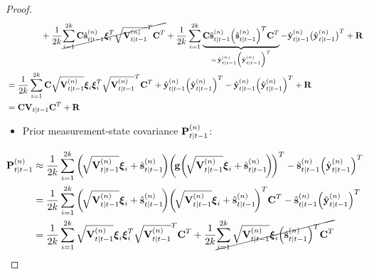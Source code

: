 \begin{proof}
\begin{align*}
						&\qquad\qquad + \frac{1}{2k} \cancel{\sum_{i = 1}^{2k} \boldsymbol{\mathrm{C}} \hat{\boldsymbol{\mathrm{s}}}_{t \vert t - 1}^{(n)} \boldsymbol{\mathrm{\xi}}_i^T \sqrt{\boldsymbol{\mathrm{V}}_{t \vert t - 1}^{(n)}}^T \boldsymbol{\mathrm{C}}^T} + \frac{1}{2k} \sum_{i = 1}^{2k} \underbrace{\boldsymbol{\mathrm{C}} \hat{\boldsymbol{\mathrm{s}}}_{t \vert t - 1}^{(n)} \Big(\hat{\boldsymbol{\mathrm{s}}}_{t \vert t - 1}^{(n)}\Big)^T \boldsymbol{\mathrm{C}}^T}_{=\, \hat{\boldsymbol{\mathrm{y}}}_{t \vert t - 1}^{(n)} \Big( \hat{\boldsymbol{\mathrm{y}}}_{t \vert t - 1}^{(n)} \Big)^T} - \hat{\boldsymbol{\mathrm{y}}}_{t \vert t - 1}^{(n)} \big( \hat{\boldsymbol{\mathrm{y}}}_{t \vert t - 1}^{(n)} \big)^T + \boldsymbol{\mathrm{R}} \\
					&= \frac{1}{2k} \sum_{i = 1}^{2k} \boldsymbol{\mathrm{C}} \sqrt{\boldsymbol{\mathrm{V}}_{t \vert t - 1}^{(n)}} \boldsymbol{\mathrm{\xi}}_i \boldsymbol{\mathrm{\xi}}_i^T \sqrt{\boldsymbol{\mathrm{V}}_{t \vert t - 1}^{(n)}}^T \boldsymbol{\mathrm{C}}^T + \hat{\boldsymbol{\mathrm{y}}}_{t \vert t - 1}^{(n)} \Big( \hat{\boldsymbol{\mathrm{y}}}_{t \vert t - 1}^{(n)} \Big)^T - \hat{\boldsymbol{\mathrm{y}}}_{t \vert t - 1}^{(n)} \Big( \hat{\boldsymbol{\mathrm{y}}}_{t \vert t - 1}^{(n)} \Big)^T + \boldsymbol{\mathrm{R}} \\
					&= \boldsymbol{\mathrm{C}} \boldsymbol{\mathrm{V}}_{t \vert t - 1} \boldsymbol{\mathrm{C}}^T + \boldsymbol{\mathrm{R}}
			\end{align*}
			\begin{itemize}
				\item Prior measurement-state covariance \( \boldsymbol{\mathrm{P}}_{t \vert t - 1}^{(n)} \):
			\end{itemize}
			\begin{align*}
				\mat{P}_{t \subgiven t - 1}^{(n)}
					&\approx \frac{1}{2k} \sum_{i = 1}^{2k} \bigg(\!\sqrt{\mat{V}_{t \subgiven t - 1}^{(n)}} \vec{\xi}_i + \hat{\vec{s}}_{t \subgiven t - 1}^{(n)}\!\bigg) \bigg(\!\vec{g}\bigg(\!\sqrt{\mat{V}_{t \subgiven t - 1}^{(n)}} \vec{\xi}_i + \hat{\vec{s}}_{t \subgiven t - 1}^{(n)}\!\bigg)\!\bigg)^T - \hat{\vec{s}}_{t \subgiven t - 1}^{(n)} \Big( \hat{\vec{y}}_{t \subgiven t - 1}^{(n)} \Big)^T \\
					&= \frac{1}{2k} \sum_{i = 1}^{2k} \bigg(\!\sqrt{\mat{V}_{t \subgiven t - 1}^{(n)}} \vec{\xi}_i + \hat{\vec{s}}_{t \subgiven t - 1}^{(n)}\!\bigg) \bigg(\!\sqrt{\mat{V}_{t \subgiven t - 1}^{(n)}} \vec{\xi}_i + \hat{\vec{s}}_{t \subgiven t - 1}^{(n)}\!\bigg)^T \mat{C}^T - \hat{\vec{s}}_{t \subgiven t - 1}^{(n)} \Big( \hat{\vec{y}}_{t \subgiven t - 1}^{(n)} \Big)^T \\
					&= \frac{1}{2k} \sum_{i = 1}^{2k} \sqrt{\mat{V}_{t \subgiven t - 1}^{(n)}} \vec{\xi}_i \vec{\xi}_i^T \sqrt{\mat{V}_{t \subgiven t - 1}^{(n)}}^T \mat{C}^T + \frac{1}{2k} \cancel{\sum_{i = 1}^{2k} \sqrt{\mat{V}_{t \subgiven t - 1}^{(n)}} \vec{\xi}_i \Big(\hat{\vec{s}}_{t \subgiven t - 1}^{(n)}\Big)^T \mat{C}^T} \\

\end{align*}
\end{proof}
